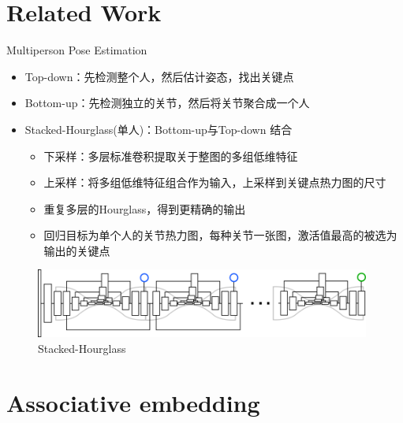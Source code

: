 \documentclass{ctexbeamer}
\begin{document}
  \section{Related Work}
  
  \begin{frame}{Multiperson Pose Estimation}
  
  \begin{itemize}
    \item Top-down：先检测整个人，然后估计姿态，找出关键点
    \item Bottom-up：先检测独立的关节，然后将关节聚合成一个人
    \item Stacked-Hourglass(单人)：Bottom-up与Top-down 结合
    \begin{itemize}
      \item 下采样：多层标准卷积提取关于整图的多组低维特征
      \item 上采样：将多组低维特征组合作为输入，上采样到关键点热力图的尺寸
      \item 重复多层的Hourglass，得到更精确的输出
      \item 回归目标为单个人的关节热力图，每种关节一张图，激活值最高的被选为输出的关键点
    \end{itemize}
  \end{itemize}
  
  \begin{figure}
    \includegraphics[width=11cm]{fig/stacked-hg-2.png}
    \caption{\label{fig:stack-hourglass}Stacked-Hourglass}
  \end{figure}
  \vskip 1cm
  \end{frame}

  
  \section{Associative embedding}
  
\end{document}

